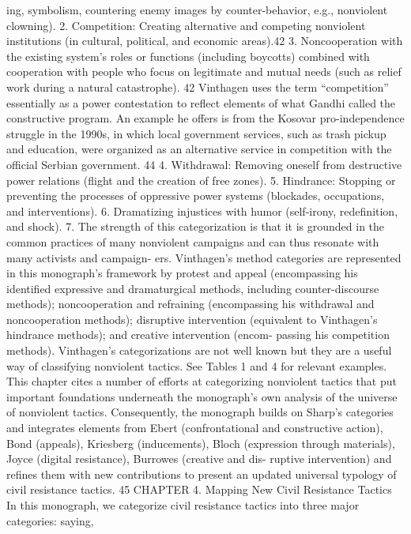 \documentclass[twoside,a4paper,12pt,fleqn,openany]{extbook}
\begin{document}
ing, symbolism, countering enemy images by counter-behavior, e.g., nonviolent
clowning).
2.	 Competition: Creating alternative and competing nonviolent institutions (in cultural,
political, and economic areas).42
3.	 Noncooperation with the existing system’s roles or functions (including boycotts)
combined with cooperation with people who focus on legitimate and mutual needs
(such as relief work during a natural catastrophe).
42
Vinthagen uses the term “competition” essentially as a power contestation to reflect elements of what Gandhi
called the constructive program. An example he offers is from the Kosovar pro-independence struggle in the
1990s, in which local government services, such as trash pickup and education, were organized as an alternative
service in competition with the official Serbian government.
44
4.	Withdrawal: Removing oneself from destructive power relations (flight and the creation
of free zones).
5.	 Hindrance: Stopping or preventing the processes of oppressive power systems
(blockades, occupations, and interventions).
6.	 Dramatizing injustices with humor (self-irony, redefinition, and shock).
7.	 The strength of this categorization is that it is grounded in the common practices of
many nonviolent campaigns and can thus resonate with many activists and campaign-
ers. Vinthagen’s method categories are represented in this monograph’s framework
by protest and appeal (encompassing his identified expressive and dramaturgical
methods, including counter-discourse methods); noncooperation and refraining
(encompassing his withdrawal and noncooperation methods); disruptive intervention
(equivalent to Vinthagen’s hindrance methods); and creative intervention (encom-
passing his competition methods). Vinthagen’s categorizations are not well known
but they are a useful way of classifying nonviolent tactics. See Tables 1 and 4 for
relevant examples.
This chapter cites a number of efforts at categorizing nonviolent tactics that put important
foundations underneath the monograph’s own analysis of the universe of nonviolent tactics.
Consequently, the monograph builds on Sharp’s categories and integrates elements from
Ebert (confrontational and constructive action), Bond (appeals), Kriesberg (inducements),
Bloch (expression through materials), Joyce (digital resistance), Burrowes (creative and dis-
ruptive intervention) and refines them with new contributions to present an updated universal
typology of civil resistance tactics.
45
CHAPTER 4. Mapping New
Civil Resistance Tactics
In this monograph, we categorize civil resistance tactics into three major categories: saying,
\end{document}
